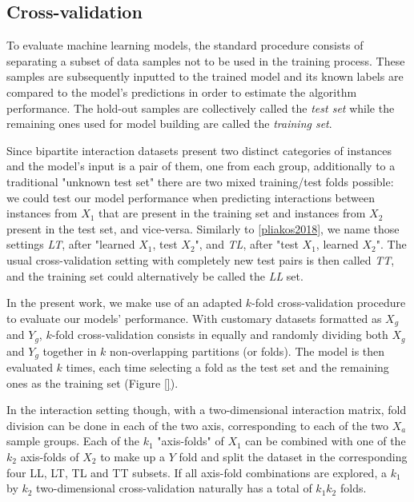 \subsection{Cross-validation}
\label{sec:cross_validation}

To evaluate machine learning models, the standard procedure consists of separating a subset of data samples not to be used in the training process. These samples are subsequently inputted to the trained model and its known labels are compared to the model's predictions in order to estimate the algorithm performance. The hold-out samples are collectively called the \emph{test set} while the remaining ones used for model building are called the \emph{training set}.

Since bipartite interaction datasets present two distinct categories of instances and the model's input is a pair of them, one from each group, additionally to a traditional "unknown test set" there are two mixed training/test folds possible: we could test our model performance when predicting interactions between instances from $X_1$ that are present in the training set and instances from $X_2$ present in the test set, and vice-versa. Similarly to \ref{pliakos2018}, %
we name those settings \emph{LT}, after "learned $X_1$, test $X_2$", and \emph{TL}, after "test $X_1$, learned $X_2$". The usual cross-validation setting with completely new test pairs is then called \emph{TT}, and the training set could alternatively be called the \emph{LL} set.

In the present work, we make use of an adapted $k$-fold cross-validation procedure to evaluate our models' performance. With customary datasets formatted as $X_g$ and $Y_g$, $k$-fold cross-validation consists in equally and randomly dividing both $X_g$ and $Y_g$ together in $k$ non-overlapping partitions (or folds). The model is then evaluated $k$ times, each time selecting a fold as the test set and the remaining ones as the training set (Figure \ref{}).

In the interaction setting though, with a two-dimensional interaction matrix, fold division can be done in each of the two axis, corresponding to each of the two $X_a$ sample groups. Each of the $k_1$ "axis-folds" of $X_1$ can be combined with one of the $k_2$ axis-folds of $X_2$ to make up a $Y$ fold and split the dataset in the corresponding four LL, LT, TL and TT subsets. If all axis-fold combinations are explored, a $k_1$ by $k_2$ two-dimensional cross-validation naturally has a total of $k_1k_2$ folds. 

